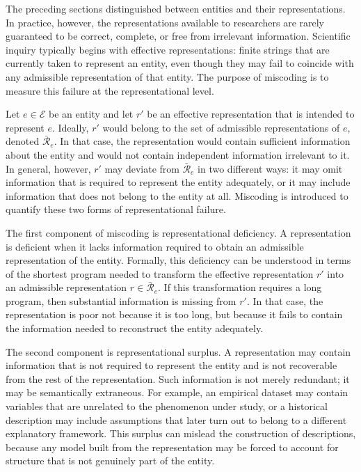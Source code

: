 The preceding sections distinguished between entities and their representations. In practice, however, the representations available to researchers are rarely guaranteed to be correct, complete, or free from irrelevant information. Scientific inquiry typically begins with effective representations: finite strings that are currently taken to represent an entity, even though they may fail to coincide with any admissible representation of that entity. The purpose of miscoding is to measure this failure at the representational level.

Let $e \in \mathcal{E}$ be an entity and let $r'$ be an effective representation that is intended to represent $e$. Ideally, $r'$ would belong to the set of admissible representations of $e$, denoted $\bar{\mathcal{R}}_e$. In that case, the representation would contain sufficient information about the entity and would not contain independent information irrelevant to it. In general, however, $r'$ may deviate from $\bar{\mathcal{R}}_e$ in two different ways: it may omit information that is required to represent the entity adequately, or it may include information that does not belong to the entity at all. Miscoding is introduced to quantify these two forms of representational failure.

The first component of miscoding is representational deficiency. A representation is deficient when it lacks information required to obtain an admissible representation of the entity. Formally, this deficiency can be understood in terms of the shortest program needed to transform the effective representation $r'$ into an admissible representation $r \in \bar{\mathcal{R}}_e$. If this transformation requires a long program, then substantial information is missing from $r'$. In that case, the representation is poor not because it is too long, but because it fails to contain the information needed to reconstruct the entity adequately.

The second component is representational surplus. A representation may contain information that is not required to represent the entity and is not recoverable from the rest of the representation. Such information is not merely redundant; it may be semantically extraneous. For example, an empirical dataset may contain variables that are unrelated to the phenomenon under study, or a historical description may include assumptions that later turn out to belong to a different explanatory framework. This surplus can mislead the construction of descriptions, because any model built from the representation may be forced to account for structure that is not genuinely part of the entity.

